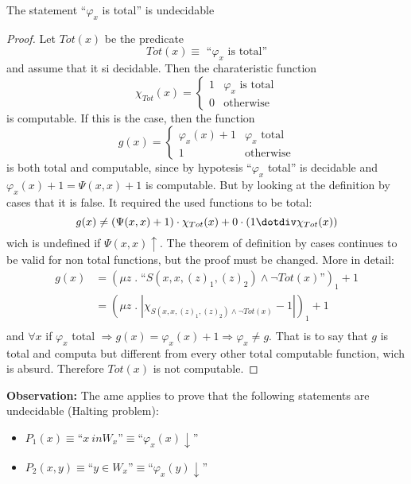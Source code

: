 \begin{theorem}
  The statement ``$\varphi_x$ is total'' is undecidable
  \begin{proof}
    Let $Tot(x)$ be the predicate
    \[ Tot(x) \equiv \mbox{ ``$\varphi_x$ is total''} \] and assume
    that it si decidable. Then the charateristic function
    \[
      \chi_{Tot}(x) = \begin{cases}
        1 & \varphi_x \mbox{ is total} \\
        0 & \mbox{otherwise}
      \end{cases}
    \]
    is computable. If this is the case, then the function
    \[
      g(x) = \begin{cases}
        \varphi_x (x) + 1 & \varphi_x \mbox{ total}\\
        1 & \mbox{otherwise}
      \end{cases}
    \]
    is both total and computable, since by hypotesis ``$\varphi_x$
    total'' is decidable and $\varphi_x(x) + 1 = \Psi(x,x) + 1$ is
    computable. But by looking at the definition by cases that it is
    false. It required the used functions to be total:
    \[ g(x) \neq (\Psi(x,x) + 1) \cdot \chi_{Tot}(x) + 0 \cdot (1
      \dotdiv \chi_{Tot}(x))\] wich is undefined if
    $\Psi(x,x) \uparrow$. The theorem of definition by cases continues
    to be valid for non total functions, but the proof must be
    changed. More in detail:
    \[
      \begin{split}
        g(x) &= (\mu z \;.\; \mbox{``}S(x,x,(z)_1, (z)_2) \wedge \lnot Tot(x)\mbox{''})_1 + 1 \\
        &= (\mu z \;.\; | \chi_{S(x,x,(z)_1, (z)_2) \wedge \lnot Tot(x)} -  1|)_1 + 1 \\
      \end{split}
    \]
    and $\forall x$ if $\varphi_x$ total
    $\Rightarrow g(x) = \varphi_x(x) + 1 \Rightarrow \varphi_x \neq
    g$. That is to say that $g$ is total and computa but different
    from every other total computable function, wich is
    absurd. Therefore $Tot(x)$ is not computable.
  \end{proof}
\end{theorem}

\textbf{Observation:} The ame applies to prove that the following
statements are undecidable (Halting problem):
\begin{itemize}
\item
  $P_1(x) \equiv \mbox{``}x \ in W_x\mbox{''} \equiv
  \mbox{``}\varphi_x(x) \downarrow \mbox{''}$
\item
  $P_2(x,y) \equiv \mbox{``} y \in W_x \mbox{''} \equiv
  \mbox{``}\varphi_x(y) \downarrow\mbox{''}$
\end{itemize}

